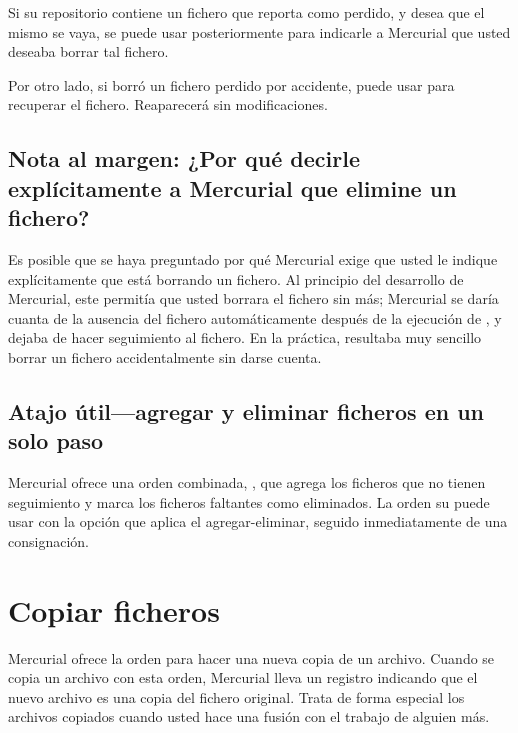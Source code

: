 Si su repositorio contiene un fichero que  reporta como
perdido, y desea que el mismo se vaya, se puede usar 
 posteriormente para
indicarle a Mercurial que usted deseaba borrar tal fichero.

Por otro lado, si borró un fichero perdido por accidente, puede usar
 para recuperar el
fichero. Reaparecerá sin modificaciones.

\subsection{Nota al margen: ¿Por qué decirle explícitamente a Mercurial
  que elimine un fichero?}

Es posible que se haya preguntado por qué Mercurial exige que usted le
indique explícitamente que está borrando un fichero. Al principio del
desarrollo de Mercurial, este permitía que usted borrara el fichero
sin más; Mercurial se daría cuanta de la ausencia del fichero
automáticamente después de la ejecución de , y dejaba de
hacer seguimiento al fichero.  En la práctica, resultaba muy sencillo
borrar un fichero accidentalmente sin darse cuenta.

\subsection{Atajo útil---agregar y eliminar ficheros en un solo paso}

Mercurial ofrece una orden combinada, , que agrega
los ficheros que no tienen seguimiento y marca los ficheros faltantes
como eliminados.
La orden  su puede usar con la opción  
que aplica el agregar-eliminar, seguido inmediatamente de una
consignación.

\section{Copiar ficheros}

Mercurial ofrece la orden  para hacer una nueva copia de
un archivo.  Cuando se copia un archivo con esta orden, Mercurial
lleva un registro indicando que el nuevo archivo es una copia del
fichero original. Trata de forma especial los archivos copiados cuando
usted hace una fusión con el trabajo de alguien más.

